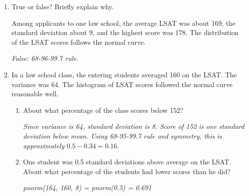 \documentclass[12pt]{article}   	%
\newcommand{\soln}[2]{\textit{\textcolor{custom_red}{#2}}}{}
\begin{document}
\begin{enumerate}
\item
  True or false? Briefly explain why.

  Among applicants to one law school, the average LSAT was about 169,
  the standard deviation about 9, and the highest score was 178. The
  distribution of the LSAT scores follows the normal curve.
  
  \soln{}{False: 68-96-99.7 rule.}
\item
  In a law school class, the entering students averaged 160 on the LSAT.
  The variance was 64. The histogram of LSAT scores followed the normal
  curve reasonable well.

  \begin{enumerate}
  \item
    About what percentage of the class scores below 152?
    
    \soln{}{Since variance is 64, standard deviation is 8. Score of 152 is one standard deviation below mean. Using 68-95-99.7 rule and symmetry, this is approximately $0.5 - 0.34 = 0.16$.}
  \item
    One student was 0.5 standard deviations above average on the LSAT.
    About what percentage of the students had lower scores than he did?
    
    \soln{}{pnorm(164, 160, 8) = pnorm(0.5) = 0.691}
  \end{enumerate}
\end{enumerate}
\end{document}
